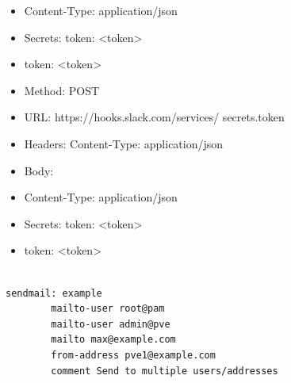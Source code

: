 \begin{itemize}[leftmargin=2cm]

	\item Content-Type: application/json

\end{itemize}

\begin{itemize}[leftmargin=2cm]

	\item Secrets: token: <token>

\end{itemize}

\begin{itemize}[leftmargin=2cm]

	\item token: <token>

\end{itemize}

\begin{itemize}[leftmargin=2cm]

	\item Method: POST

	\item URL: https://hooks.slack.com/services/{{ secrets.token }}

	\item Headers: Content-Type: application/json

	\item Body:

\end{itemize}

\begin{itemize}[leftmargin=2cm]

	\item Content-Type: application/json

\end{itemize}

\begin{itemize}[leftmargin=2cm]

	\item Secrets: token: <token>

\end{itemize}

\begin{itemize}[leftmargin=2cm]

	\item token: <token>

\end{itemize}

\begin{lstlisting}

sendmail: example
        mailto-user root@pam
        mailto-user admin@pve
        mailto max@example.com
        from-address pve1@example.com
        comment Send to multiple users/addresses

\end{lstlisting}

